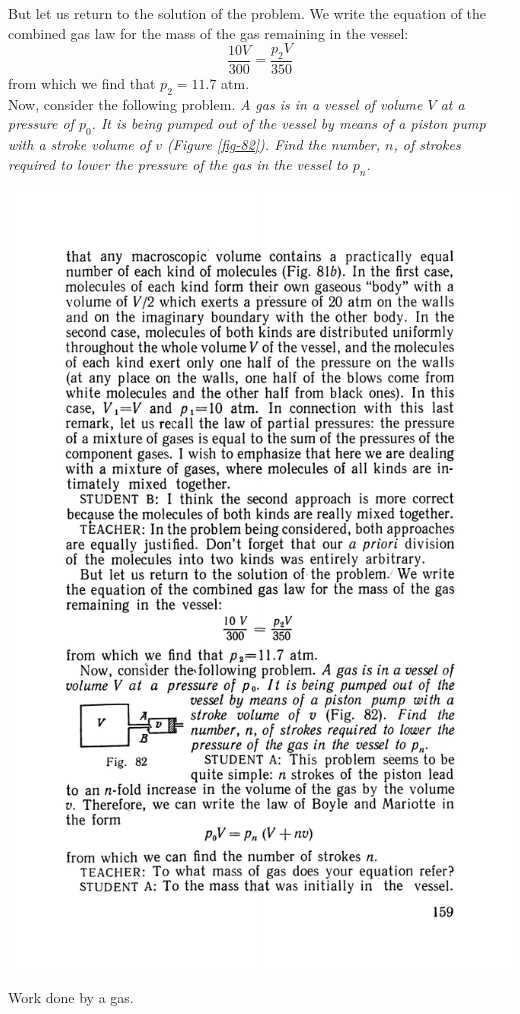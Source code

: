 \documentclass[a4paper,sfsidenotes]{tufte-book}
\begin{document}
But let us return to the solution of the problem. We write the equation of the combined gas law for the mass of the gas remaining in the vessel:
\begin{equation*}%
\frac{10 V}{300} = \frac{p_{2}V}{350}
\end{equation*}
from which we find that $p_{2}=11.7$ atm. 
\\
Now, consider the following problem. \emph{A gas is in a vessel of volume $V$ at a pressure of $p_{0}$. It is being pumped out of the vessel by means of a piston pump with a stroke volume of $v$ (\emph{Figure \ref{fig-82}}). Find the number, $n$, of strokes required to lower the pressure of the gas in the vessel to $p_{n}$.}
\begin{marginfigure}%
\centering
\includegraphics[width=0.7\linewidth]{fig-082a}
\caption{Work done by a gas.}
\label{fig-82}
\end{marginfigure}
\end{document}
